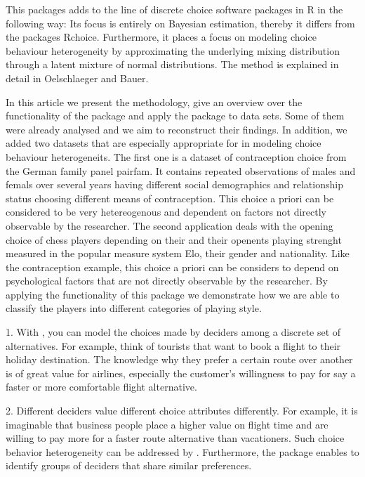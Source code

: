 \documentclass[article]{jss}
\begin{document}
This packages adds to the line of discrete choice software packages in R in the following way: Its focus is entirely on Bayesian estimation, thereby it differs from the packages Rchoice. Furthermore, it places a focus on modeling choice behaviour heterogeneity by approximating the underlying mixing distribution through a latent mixture of normal distributions. The method is explained in detail in Oelschlaeger and Bauer.

In this article we present the methodology, give an overview over the functionality of the package and apply the package to data sets. Some of them were already analysed and we aim to reconstruct their findings. In addition, we added two datasets that are especially appropriate for  in modeling choice behaviour heterogeneits. The first one is a dataset of contraception choice from the German family panel pairfam. It contains repeated observations of males and femals over several years having different social demographics and relationship status choosing different means of contraception. This choice a priori can be considered to be very hetereogenous and dependent on factors not directly observable by the researcher. The second application deals with the opening choice of chess players depending on their and their openents playing strenght measured in the popular measure system Elo, their gender and nationality. Like the contraception example, this choice a priori can be considers to depend on psychological factors that are not directly observable by the researcher. By applying the functionality of this package we demonstrate how we are able to classify the players into different categories of playing style.

1. With , you can model the choices made by deciders among a discrete set of alternatives. For example, think of tourists that want to book a flight to their holiday destination. The knowledge why they prefer a certain route over another is of great value for airlines, especially the customer's willingness to pay for say a faster or more comfortable flight alternative.

2. Different deciders value different choice attributes differently. For example, it is imaginable that business people place a higher value on flight time and are willing to pay more for a faster route alternative than vacationers. Such choice behavior heterogeneity can be addressed by . Furthermore, the package enables to identify groups of deciders that share similar preferences.
\end{document}
